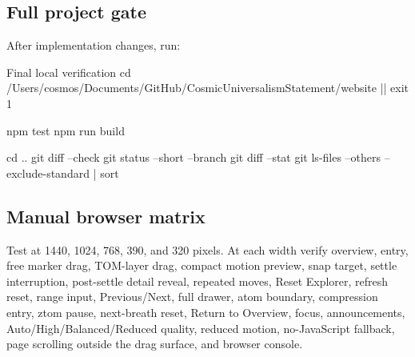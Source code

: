 \documentclass[11pt,letterpaper]{article}
\begin{document}
\subsection{Full project gate}
After implementation changes, run:
\begin{commandbox}{Final local verification}
cd /Users/cosmos/Documents/GitHub/CosmicUniversalismStatement/website || exit 1

npm test
npm run build

cd ..
git diff --check
git status --short --branch
git diff --stat
git ls-files --others --exclude-standard | sort
\end{commandbox}

\subsection{Manual browser matrix}
Test at 1440, 1024, 768, 390, and 320 pixels. At each width verify overview, entry, free marker drag, TOM-layer drag, compact motion preview, snap target, settle interruption, post-settle detail reveal, repeated moves, Reset Explorer, refresh reset, range input, Previous/Next, full drawer, atom boundary, compression entry, ztom pause, next-breath reset, Return to Overview, focus, announcements, Auto/High/Balanced/Reduced quality, reduced motion, no-JavaScript fallback, page scrolling outside the drag surface, and browser console.
\end{document}
